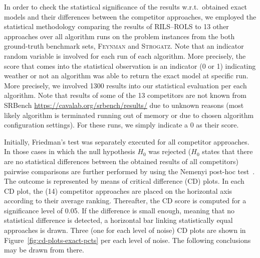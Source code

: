 \documentclass[a4paper,12pt]{elsarticle}
\begin{document}
In order to check the statistical significance of the results w.r.t.\ obtained exact models and their differences between the competitor approaches, we employed the statistical methodology comparing the results of \textsc{RILS}--\textsc{ROLS} to 13 other approaches over all algorithm runs on the problem instances from the both ground-truth benchmark sets, \textsc{Feynman} and \textsc{Strogatz}. Note that an indicator random variable is involved for each run of each algorithm. More precisely, the score that comes into the statistical observation is an indicator (0 or 1) indicating weather or not an algorithm was able to return the exact model at specific run. More precisely, we involved 1300 results into our statistical evaluation per each algorithm. Note that  results of some of the 13 competitors are not known from SRBench \url{https://cavalab.org/srbench/results/} due to   unknown reasons (most likely algorithm is terminated running out of memory or due to   chosen algorithm configuration settings). For these runs, we simply indicate a 0 as their score.   

Initially, Friedman’s test was separately executed for all competitor approaches.      In those cases in which the null hypothesis $H_0$ was rejected ($H_0$ states that there are no statistical differences between the obtained results of all competitors) pairwise comparisons are further performed by using the Nemenyi post-hoc test~\cite{pohlert2014pairwise}. The outcome is represented by means of critical difference (CD) plots. In each CD plot, the (14) competitor approaches are placed on the horizontal axis according to their average ranking. Thereafter, the CD score is computed for a significance level of 0.05. If the difference is small enough, meaning that no statistical difference is detected, a horizontal bar linking statistically equal approaches is drawn.   Three (one for each level of noise) CD plots are shown in Figure~\ref{fig:cd-plots-exact-pcts} per each level of noise. The following conclusions may be drawn from there.
\end{document}
